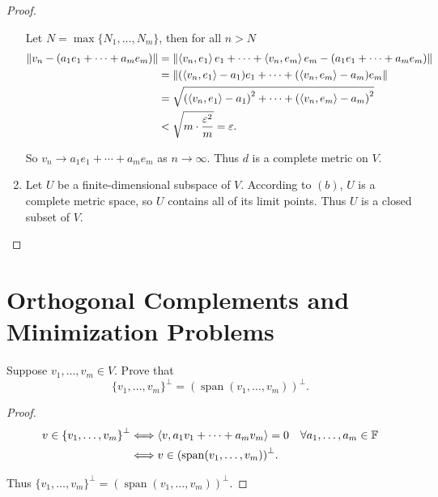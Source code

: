 \begin{proof}
\begin{enumerate}[label={(\alph*)}]
              Let $N = \max\{ N_{1}, \ldots, N_{m} \}$, then for all $n > N$
              \begin{align*}
                  \left\Vert{v_{n} - (a_{1}e_{1} + \cdots + a_{m}e_{m})}\right\Vert & = \left\Vert{\left\langle{v_{n}, e_{1}}\right\rangle e_{1} + \cdots + \left\langle{v_{n}, e_{m}}\right\rangle e_{m} - (a_{1}e_{1} + \cdots + a_{m}e_{m})}\right\Vert \\
                                                                    & = \left\Vert{(\left\langle{v_{n}, e_{1}}\right\rangle - a_{1})e_{1} + \cdots + (\left\langle{v_{n}, e_{m}}\right\rangle - a_{m})e_{m}}\right\Vert                  \\
                                                                    & = \sqrt{{(\left\langle{v_{n}, e_{1}}\right\rangle - a_{1})}^{2} + \cdots + {(\left\langle{v_{n}, e_{m}}\right\rangle - a_{m})}^{2}}                \\
                                                                    & < \sqrt{m\cdot \frac{\varepsilon^{2}}{m}} = \varepsilon.
              \end{align*}

              So $v_{n}\to a_{1}e_{1} + \cdots + a_{m}e_{m}$ as $n\to\infty$. Thus $d$ is a complete metric on $V$.
        \item Let $U$ be a finite-dimensional subspace of $V$. According to $(b)$, $U$ is a complete metric space, so $U$ contains all of its limit points. Thus $U$ is a closed subset of $V$.
    \end{enumerate}
\end{proof}
\newpage

\section{Orthogonal Complements and Minimization Problems}

\begin{exercise}
    Suppose $v_{1}, \ldots, v_{m}\in V$. Prove that
    \[
        {\{ v_{1}, \ldots, v_{m} \}}^{\bot} = {(\operatorname{span}(v_{1}, \ldots, v_{m}))}^{\bot}.
    \]
\end{exercise}

\begin{proof}
    \begin{align*}
        v\in {\{ v_{1}, \ldots, v_{m} \}}^{\bot} & \Longleftrightarrow \left\langle{v, a_{1}v_{1} + \cdots + a_{m}v_{m}}\right\rangle = 0\quad\forall a_{1}, \ldots, a_{m}\in\mathbb{F} \\
                                                 & \Longleftrightarrow v\in {(\operatorname{span}(v_{1}, \ldots, v_{m}))}^{\bot}.
    \end{align*}

    Thus ${\{ v_{1}, \ldots, v_{m} \}}^{\bot} = {(\operatorname{span}(v_{1}, \ldots, v_{m}))}^{\bot}$.
\end{proof}
\newpage


